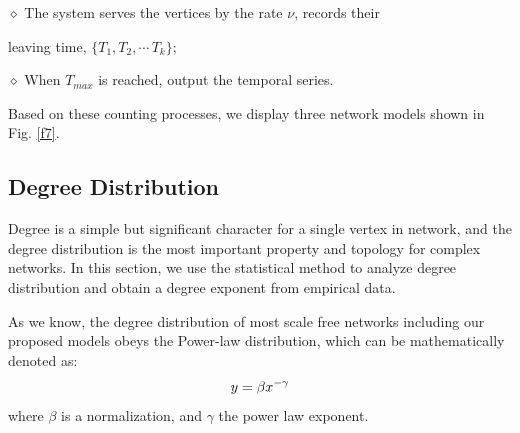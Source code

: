 \documentclass[final]{IEEEtran}
\begin{document}
\noindent$\diamond$ The system serves the vertices by the rate
$\nu$, records their

leaving time, $\{T_{1}, T_{2},  \cdots\, T_{k}\}$;

\noindent$\diamond$ When $T_{max}$ is reached, output the temporal
series.




Based on these counting processes, we display three network models
shown in Fig. \ref{f7}. %




\subsection{Degree Distribution}
Degree is a simple but significant character for a single vertex
in network, and the degree distribution is the most important
property and topology for complex networks. In this section, we
use the statistical method to analyze degree distribution and
obtain a degree exponent from empirical data.


As we know, the degree distribution of most scale free networks
including our proposed models obeys the Power-law distribution,
which can be mathematically denoted as:
\begin{equation}\label{e46}\footnotesize
y=\beta x^{-\gamma}
\end{equation}
where $\beta$ is a normalization, and $\gamma$ the power law
exponent. %
\end{document}
